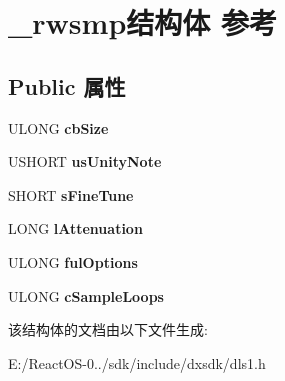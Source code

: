 \hypertarget{struct__rwsmp}{}\section{\+\_\+rwsmp结构体 参考}
\label{struct__rwsmp}
\subsection*{Public 属性}
\begin{DoxyCompactItemize}
\item 
\mbox{\label{struct__rwsmp_a9b5cfde11575caa739fb8f14485bfbef}} 
U\+L\+O\+NG {\bfseries cb\+Size}
\item 
\mbox{\label{struct__rwsmp_ab633a9841c0870f467a17eda72a37f0a}} 
U\+S\+H\+O\+RT {\bfseries us\+Unity\+Note}
\item 
\mbox{\label{struct__rwsmp_a42516a6080e4fb1e3b3f9e12b5111f0e}} 
S\+H\+O\+RT {\bfseries s\+Fine\+Tune}
\item 
\mbox{\label{struct__rwsmp_a22feb261d4dbc814884b1d20a1cb3988}} 
L\+O\+NG {\bfseries l\+Attenuation}
\item 
\mbox{\label{struct__rwsmp_a428f06d8383d68d41b22b7fc4ed804eb}} 
U\+L\+O\+NG {\bfseries ful\+Options}
\item 
\mbox{\label{struct__rwsmp_a999211c3ef0f92abc1526463903887c6}} 
U\+L\+O\+NG {\bfseries c\+Sample\+Loops}
\end{DoxyCompactItemize}


该结构体的文档由以下文件生成\+:\begin{DoxyCompactItemize}
\item 
E\+:/\+React\+O\+S-\/0../sdk/include/dxsdk/dls1.\+h\end{DoxyCompactItemize}

